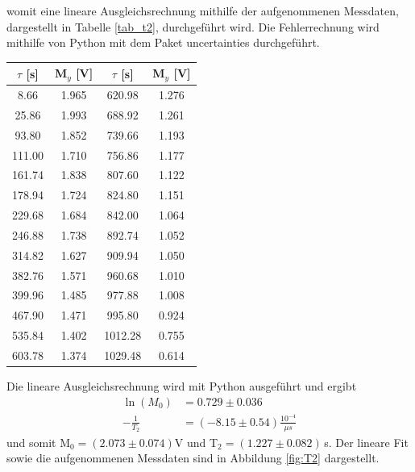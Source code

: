 \documentclass[]{scrartcl}
\begin{document}
womit eine lineare Ausgleichsrechnung mithilfe der aufgenommenen Messdaten, dargestellt in Tabelle \ref{tab_t2}, durchgeführt wird. Die Fehlerrechnung wird mithilfe von Python mit dem Paket uncertainties durchgeführt.\\
\begin{center}
	\begin{tabular}{|c|c||c|c|}
		\hline	$\tau$ [s]	&	M$_y$ [V] & $\tau$ [s]	&	M$_y$ [V]\\
		\hline	8.66	&	1.965	&	620.98	&	1.276	\\
		\hline	25.86	&	1.993	&	688.92	&	1.261	\\
		\hline	93.80	&	1.852	&	739.66	&	1.193	\\
		\hline	111.00	&	1.710	&	756.86	&	1.177	\\
		\hline	161.74	&	1.838	&	807.60	&	1.122	\\
		\hline	178.94	&	1.724	&	824.80	&	1.151	\\
		\hline	229.68	&	1.684	&	842.00	&	1.064	\\
		\hline	246.88	&	1.738	&	892.74	&	1.052	\\
		\hline	314.82	&	1.627	&	909.94	&	1.050	\\
		\hline	382.76	&	1.571	&	960.68	&	1.010	\\
		\hline	399.96	&	1.485	&	977.88	&	1.008	\\
		\hline	467.90	&	1.471	&	995.80	&	0.924	\\
		\hline	535.84	&	1.402	&	1012.28	&	0.755	\\
		\hline	603.78	&	1.374	&	1029.48	&	0.614	\\
		\hline
	\end{tabular}
	\label{tab_t2}
\end{center}
Die lineare Ausgleichsrechnung wird mit Python ausgeführt und ergibt 
\begin{align*}
\ln(M_0)&=0.729 \pm 0.036 \\
-\frac{1}{T_2}&= (-8.15 \pm 0.54) \frac{10^{-4}}{\mu s}
\end{align*}
und somit M$_0=(2.073 \pm 0.074)$V und T$_2=(1.227 \pm 0.082)\,$s.
Der lineare Fit sowie die aufgenommenen Messdaten sind in Abbildung \ref{fig:T2} dargestellt.
\end{document}
